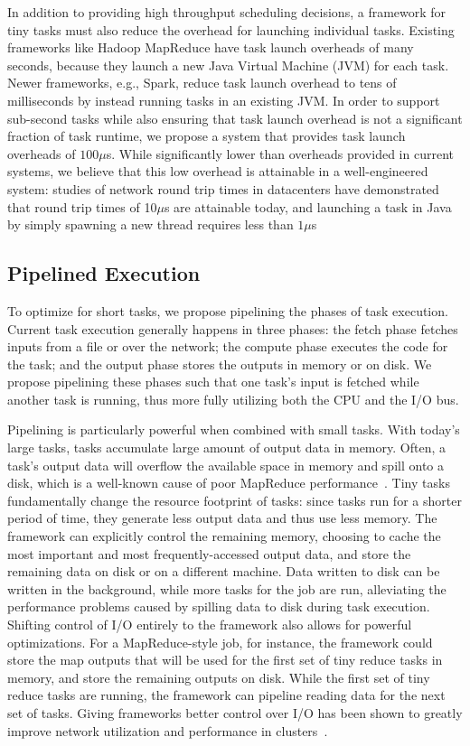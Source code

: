 In addition to providing high throughput scheduling decisions, a framework for
tiny tasks must also reduce the overhead
for launching individual tasks. Existing frameworks like Hadoop MapReduce
have task launch overheads of many seconds, because they launch a new Java
Virtual Machine (JVM) for each task. Newer frameworks, e.g., Spark, reduce task
launch overhead to tens of milliseconds by instead running tasks in an
existing JVM.  In order to support sub-second tasks while also ensuring that
task launch overhead is not a significant fraction of task runtime, we propose a system
that provides task launch overheads of $100 \mu$s. While significantly
lower than overheads provided in current systems, we believe that this low
overhead is attainable in a well-engineered system:
studies of network round
trip times in datacenters have demonstrated that round trip times of 10$\mu$s
are attainable today, and launching a task in Java by simply
spawning a new thread requires less than $1\mu$s

\subsection{Pipelined Execution}
\label{sec:pipeline}
To optimize for short tasks, we propose pipelining the phases of task execution.
Current task execution generally happens in three phases: the fetch phase fetches inputs from a file or over the network; the compute phase executes the code
for the task; and the output phase stores the outputs in memory or on disk.
We propose pipelining these phases such that one task's input is fetched while
another task is running, thus more fully utilizing both the CPU and the I/O
bus.

Pipelining is particularly powerful when combined with small tasks. With
today's large tasks, tasks accumulate large amount of output data in memory.
Often, a task's output data will overflow the available space in memory
and spill onto a disk, which is a well-known cause of poor MapReduce
performance~\cite{toddlipconthing}. Tiny tasks fundamentally change the
resource footprint of tasks: since tasks run for a shorter period of time,
they generate less output data and thus use less memory. The framework can
explicitly control the remaining memory, choosing to cache the most important
and most frequently-accessed output data, and store the remaining data on disk
or on a different machine. Data written to disk can be written in the
background, while more tasks for the job are run, alleviating the performance
problems caused by spilling data to disk during task execution.
Shifting control of I/O entirely to the framework also allows for
powerful optimizations.  For a MapReduce-style job, for instance, the
framework could store the map outputs that will be used for the first set of
tiny reduce tasks in memory, and store the remaining outputs on disk. While
the first set of tiny reduce tasks are running, the framework can pipeline
reading data for the next set of tasks.  Giving frameworks better control over
I/O has been shown
to greatly improve network utilization and performance in
clusters~\cite{chowdhury2011managing, chowdhury2012coflow}.

